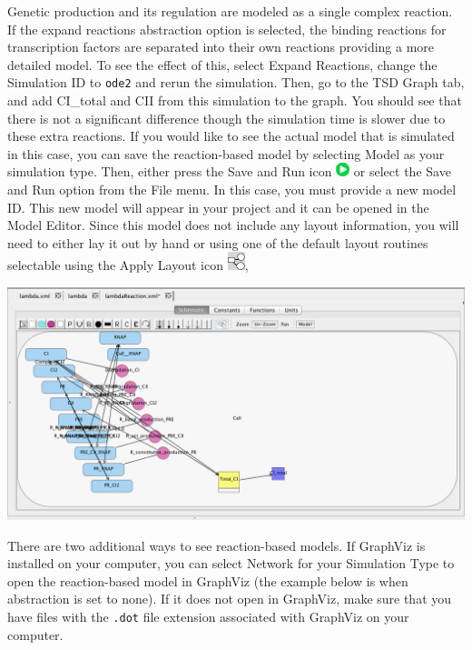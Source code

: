 \documentclass[titlepage,11pt]{article}
\begin{document}
Genetic production and its regulation are modeled as a single complex reaction.  If the expand reactions abstraction option is selected, the binding reactions for transcription factors are separated into their own reactions providing a more detailed model.  To see the effect of this, select Expand Reactions, change the Simulation ID to {\tt ode2} and rerun the simulation.  Then, go to the TSD Graph tab, and add CI\_total and CII from this simulation to the graph.  You should see that there is not a significant difference though the simulation time is slower due to these extra reactions.  If you would like to see the actual model that is simulated in this case,  you can save the reaction-based model by selecting Model as your simulation type.  Then, either press the Save and Run icon \includegraphics{../gui/icons/run-icon} or select the Save and Run option from the File menu.  In this case, you must provide a new model ID.  This new model will appear in your project and it can be opened in the Model Editor.  Since this model does not include any layout information, you will need to either lay it out by hand or using one of the default layout routines selectable using the Apply Layout icon    \includegraphics{../gui/icons/modelview/choose_layout_selected},

\begin{center}
\includegraphics[width=160mm]{screenshots/reactionModel}
\end{center}

There are two additional ways to see reaction-based models.  If GraphViz is installed on your computer, you can select Network for your Simulation Type to open the reaction-based model in GraphViz (the example below is when abstraction is set to none).   If it does not open in GraphViz, make sure that you have files with the {\tt .dot} file extension associated with GraphViz on your computer.  
\end{document}
